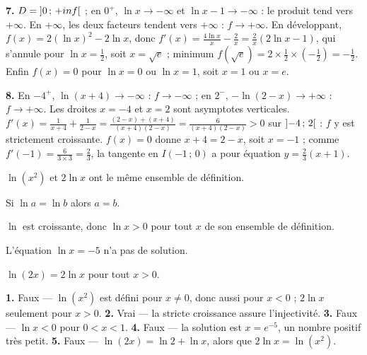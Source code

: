 \begin{corrige}[annales]
\textbf{7.} $D = \left]0\,;\,+inf\right[$ ; en $0^{+}$, $\ln x \to
-\infty$ et $\ln x-1 \to -\infty$ : le produit tend vers $+\infty$. En
$+\infty$, les deux facteurs tendent vers $+\infty$ : $f \to +\infty$. En
développant, $f(x) = 2(\ln x)^{2}-2\ln x$, donc
$f'(x) = \frac{4\ln x}{x}-\frac2x = \frac2x\left(2\ln x-1\right)$, qui
s'annule pour $\ln x = \frac12$, soit $x = \sqrt e$ ; minimum
$f(\sqrt e) = 2\times\frac12\times\left(-\frac12\right) = -\frac12$. Enfin
$f(x) = 0$ pour $\ln x = 0$ ou $\ln x = 1$, soit $x = 1$ ou $x = e$.

\textbf{8.} En $-4^{+}$, $\ln(x+4) \to -\infty$ : $f \to -\infty$ ; en
$2^{-}$, $-\ln(2-x) \to +\infty$ : $f \to +\infty$. Les droites $x = -4$ et
$x = 2$ sont asymptotes verticales.
$f'(x) = \frac{1}{x+4}+\frac{1}{2-x} = \frac{(2-x)+(x+4)}{(x+4)(2-x)}
= \frac{6}{(x+4)(2-x)} > 0$ sur $\left]-4\,;\,2\right[$ : $f$ y est
strictement croissante. $f(x) = 0$ donne $x+4 = 2-x$, soit $x = -1$ ; comme
$f'(-1) = \frac{6}{3\times3} = \frac23$, la tangente en $I(-1\,;\,0)$ a pour
équation $y = \frac23(x+1)$.
\end{corrige}

\begin{vraifaux}
\exo $\ln(x^{2})$ et $2\ln x$ ont le même ensemble de définition.

\exo Si $\ln a = \ln b$ alors $a = b$.

\exo $\ln$ est croissante, donc $\ln x > 0$ pour tout $x$ de son ensemble de
définition.

\exo L'équation $\ln x = -5$ n'a pas de solution.

\exo $\ln(2x) = 2\ln x$ pour tout $x>0$.
\end{vraifaux}

\begin{corrige}
\textbf{1.} Faux — $\ln(x^{2})$ est défini pour $x \neq 0$, donc aussi pour
$x<0$ ; $2\ln x$ seulement pour $x>0$.
\textbf{2.} Vrai — la stricte croissance assure l'injectivité.
\textbf{3.} Faux — $\ln x<0$ pour $0<x<1$.
\textbf{4.} Faux — la solution est $x = e^{-5}$, un nombre positif très
petit.
\textbf{5.} Faux — $\ln(2x) = \ln2+\ln x$, alors que $2\ln x = \ln(x^{2})$.
\end{corrige}

